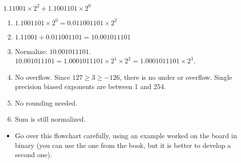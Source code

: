 \ifnum{}
\begin{frame}[fragile]
$1.11001 \times 2^2 + 1.1001101 \times 2^0$
    \begin{multicols}{2}
\begin{minipage}{2in}
        \begin{enumerate}
\item $1.1001101 \times 2^0 = 0.011001101 \times 2^2$
\item $1.11001 + 0.011001101 = 10.001011101$
\item Normalize: $10.001011101$. $ 10.001011101 = 1.0001011101 \times 2^1 \times 2^2 = 1.0001011101 \times 2^3$.
\item No overflow. Since $127 \geq 3 \geq -126$, there is no under or overflow. {\tiny Single precision biased exponents are between 1 and 254.}
\item No rounding needed.
\item Sum is still normalized. 
\end{enumerate}
\end{minipage}

\columnbreak
    \end{multicols}
\BNotes\ifnum{}
\begin{itemize}
\item Go over this flowchart carefully, using an example worked on the
board in binary (you can use the one from the book, but it is better
to develop a second one). 
\end{itemize}
\fi\ENotes
\end{frame}
\fi

